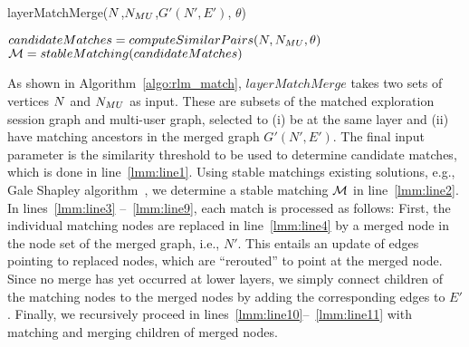      \begin{algorithm}[t]
	\caption{layerMatchMerge($N$,$N_{MU}$,$G'(N',E')$, $\theta$)}
	 \label{algo:rlm_match}
    
		$candidateMatches = computeSimilarPairs(N, N_{MU}, \theta)$\;  \label{lmm:line1}
	${\mathcal M} = stableMatching(candidateMatches)$\;\label{lmm:line2}

    \end{algorithm}



    As shown in Algorithm~\ref{algo:rlm_match}, $layerMatchMerge$ takes two sets of vertices $N$ and $N_{MU}$ as input. These are subsets of the matched exploration session graph and multi-user graph, selected to (i) be at the same layer and (ii) have matching ancestors in the merged graph $G'(N',E')$. The final input parameter is the similarity threshold to be used to determine candidate matches, which is done in line~\ref{lmm:line1}. 
Using stable matchings existing solutions, e.g., Gale Shapley algorithm~\cite{StableM},  we determine a stable matching ${\mathcal M}$ in line~\ref{lmm:line2}. In lines~\ref{lmm:line3} --~\ref{lmm:line9}, each match is  processed as follows: First, the individual matching nodes are replaced in line~\ref{lmm:line4} by a merged node in the node set of the merged graph, i.e., $N'$. This entails an update of edges pointing to replaced nodes, which are ``rerouted'' to point at the merged node. Since no merge has yet occurred at lower layers, we simply connect children of the matching nodes to the merged nodes by adding the corresponding edges to $E'$. Finally, we recursively proceed in lines~\ref{lmm:line10}--~\ref{lmm:line11} with matching and merging children of merged nodes.
    
